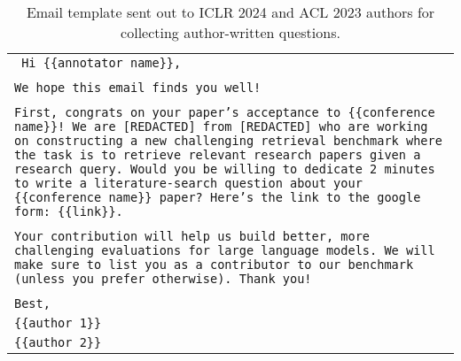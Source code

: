 \begin{table*}[h]
    \centering
    \small
    \begin{tabular}{>{\raggedright\arraybackslash\tt}p{}<{}}
        \toprule
            \vspace{-1em}
            Hi \{\{annotator name\}\}, \\ \\

            We hope this email finds you well! \\ \\
            
            First, congrats on your paper’s acceptance to \{\{conference name\}\}! We are [REDACTED] from [REDACTED] who are working on constructing a new challenging retrieval benchmark where the task is to retrieve relevant research papers given a research query. Would you be willing to dedicate 2 minutes to write a literature-search question about your \{\{conference name\}\} paper?  Here's the link to the google form: \{\{link\}\}. \\ \\
            
            Your contribution will help us build better, more challenging evaluations for large language models. We will make sure to list you as a contributor to our benchmark (unless you prefer otherwise). Thank you! \\ \\
            
            Best, \\
            \{\{author 1\}\} \\
            \{\{author 2\}\} \\
        \bottomrule
    \end{tabular}
    \caption{
        Email template sent out to ICLR 2024 and ACL 2023 authors for collecting author-written questions.
    }
    \label{tab:author_email}
\end{table*}

